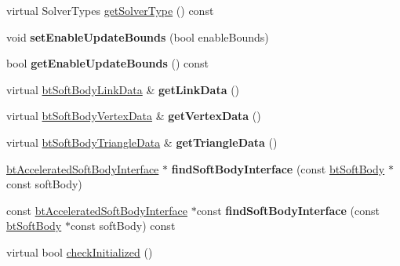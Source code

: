\begin{DoxyCompactItemize}
\item 
virtual Solver\+Types \hyperlink{classbtDX11SoftBodySolver_a1142bb4f735d275f161f003f7d703768}{get\+Solver\+Type} () const
\item 
\mbox{\label{classbtDX11SoftBodySolver_ad84c9f5da1e1971c11882dd91f4d0f2b}} 
void {\bfseries set\+Enable\+Update\+Bounds} (bool enable\+Bounds)
\item 
\mbox{\label{classbtDX11SoftBodySolver_aae5b1c4c04b70b0e87c029905f115959}} 
bool {\bfseries get\+Enable\+Update\+Bounds} () const
\item 
\mbox{\label{classbtDX11SoftBodySolver_a774cf33c343188d7d88ad068c6def193}} 
virtual \hyperlink{classbtSoftBodyLinkData}{bt\+Soft\+Body\+Link\+Data} \& {\bfseries get\+Link\+Data} ()
\item 
\mbox{\label{classbtDX11SoftBodySolver_a063fd8c27e71e139386b8856bb0d84e6}} 
virtual \hyperlink{classbtSoftBodyVertexData}{bt\+Soft\+Body\+Vertex\+Data} \& {\bfseries get\+Vertex\+Data} ()
\item 
\mbox{\label{classbtDX11SoftBodySolver_a91ae67dcfead3a26a2d299102ddc1412}} 
virtual \hyperlink{classbtSoftBodyTriangleData}{bt\+Soft\+Body\+Triangle\+Data} \& {\bfseries get\+Triangle\+Data} ()
\item 
\mbox{\label{classbtDX11SoftBodySolver_a9bc6b0515851dc759a90d951456fb331}} 
\hyperlink{classbtDX11SoftBodySolver_1_1btAcceleratedSoftBodyInterface}{bt\+Accelerated\+Soft\+Body\+Interface} $\ast$ {\bfseries find\+Soft\+Body\+Interface} (const \hyperlink{classbtSoftBody}{bt\+Soft\+Body} $\ast$const soft\+Body)
\item 
\mbox{\label{classbtDX11SoftBodySolver_ad81aa569b2b53bd3523e4ef54ff7edc3}} 
const \hyperlink{classbtDX11SoftBodySolver_1_1btAcceleratedSoftBodyInterface}{bt\+Accelerated\+Soft\+Body\+Interface} $\ast$const {\bfseries find\+Soft\+Body\+Interface} (const \hyperlink{classbtSoftBody}{bt\+Soft\+Body} $\ast$const soft\+Body) const
\item 
virtual bool \hyperlink{classbtDX11SoftBodySolver_aeb15cea9089da79d1eb40f3786ec86a0}{check\+Initialized} ()

\end{DoxyCompactItemize}

